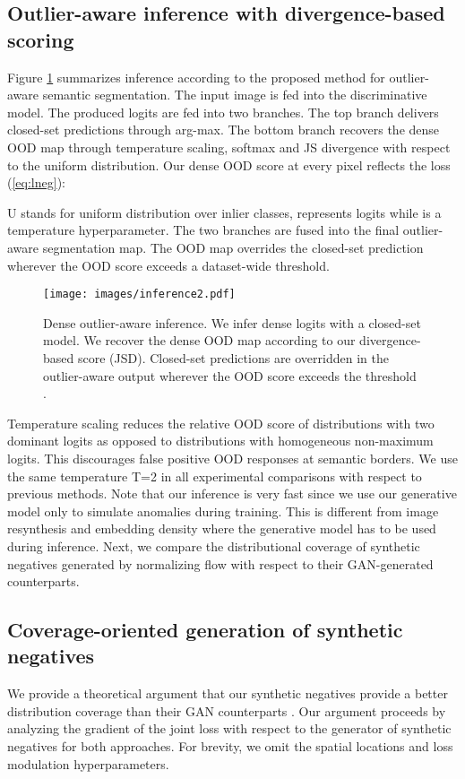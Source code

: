 \documentclass[lettersize,journal,hidelinks]{IEEEtran}
\begin{document}
\subsection{Outlier-aware inference with divergence-based scoring}
\label{sec:div-inf}

Figure \ref{fig:infrence-scheme} summarizes inference according to the proposed method for outlier-aware semantic segmentation.
The input image is fed into the discriminative model. 
The produced logits are fed into two branches.
The top branch delivers closed-set predictions through arg-max.
The bottom branch recovers the dense OOD map through temperature scaling, softmax and JS divergence with respect
to the uniform distribution.
Our dense OOD score at every pixel  reflects the  loss (\ref{eq:lneg}):

U stands for uniform distribution over inlier classes,  represents logits while  is a temperature hyperparameter.
The two branches are fused into the final outlier-aware segmentation map.
The OOD map overrides the closed-set prediction wherever the OOD score exceeds a dataset-wide threshold.
\begin{figure}[ht]
    \centering
    \texttt{[image: images/inference2.pdf]}
    \caption{Dense outlier-aware inference. 
We infer dense logits with a closed-set model.
We recover the dense OOD map according to our divergence-based score (JSD).
Closed-set predictions are overridden in the outlier-aware output wherever the OOD score exceeds the threshold .}
    \label{fig:infrence-scheme}
\end{figure}

Temperature scaling \cite{guo17icml} reduces the relative OOD score of distributions with two dominant logits as opposed to distributions with homogeneous non-maximum logits.
This discourages false positive OOD responses at semantic borders.
We use the same temperature T=2 in all experimental comparisons with respect to previous methods.   
Note that our inference is very fast since we use our generative model  only to simulate anomalies during training. 
This is different from image resynthesis \cite{lis19iccv} and embedding density \cite{blum21ijcv} where the generative model has to be used during inference.
Next, we compare the distributional coverage of synthetic negatives generated by normalizing flow with respect to their GAN-generated counterparts.

\subsection{
Coverage-oriented generation of synthetic negatives 
}
\label{sec:theoretical_analysis} 
We provide a theoretical argument
that our synthetic negatives provide
a better distribution coverage
than their GAN counterparts \cite{lee18iclr}.
Our argument proceeds by analyzing 
the gradient of the joint loss 
with respect to the generator of synthetic negatives for both approaches.
For brevity, we omit the spatial locations and loss modulation hyperparameters.
\end{document}

